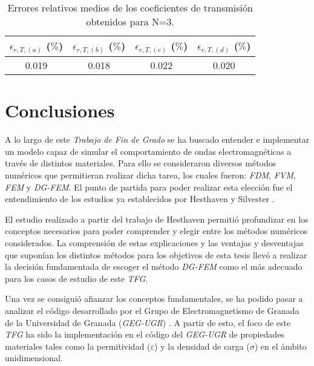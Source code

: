 \documentclass[11pt,a4paper,twoside,pdf]{article}
\numberwithin{equation}{section}
\begin{document}
\begin{table}[H]
\centering
\begin{tabular}{|c|c|c|c|}
\hline
\textbf{$\epsilon_{r,T,(a)}$ ($\%$)} & \textbf{$\epsilon_{r,T,(b)}$ ($\%$)} & \textbf{$\epsilon_{r,T,(c)}$ ($\%$)} & \textbf{$\epsilon_{r,T,(d)}$ ($\%$)} \\ \hline
0.019                                & 0.018                                & 0.022                                & 0.020                                \\ \hline
\end{tabular}
\caption{Errores relativos medios de los coeficientes de transmisión obtenidos para N=3.}
\label{tab5}
\end{table}

\newpage

\section{Conclusiones}

A lo largo de este \textit{Trabajo de Fin de Grado} se ha buscado entender e implementar un modelo capaz de simular el comportamiento de ondas electromagnéticas a través de distintos materiales. Para ello se consideraron diversos métodos numéricos que permitieran realizar dicha tarea, los cuales fueron: \textit{FDM}, \textit{FVM}, \textit{FEM} y \textit{DG-FEM}. El punto de partida para poder realizar esta elección fue el entendimiento de los estudios ya establecidos por Hesthaven \cite{Hesthaven} y Silvester \cite{Silvester}.

El estudio realizado a partir del trabajo de Hesthaven permitió profundizar en los conceptos necesarios para poder comprender y elegir entre los métodos numéricos considerados. La comprensión de estas explicaciones y las ventajas y desventajas que suponían los distintos métodos para los objetivos de esta tesis llevó a realizar la decisión fundamentada de escoger el método \textit{DG-FEM} como el más adecuado para los casos de estudio de este \textit{TFG}. 

Una vez se consiguió afianzar los conceptos fundamentales, se ha podido pasar a analizar el código desarrollado por el Grupo de Electromagnetismo de Granada de la Universidad de Granada (\textit{GEG-UGR}) \cite{repo}. A partir de esto, el foco de este \textit{TFG} ha sido la implementación en el código del \textit{GEG-UGR} de propiedades materiales tales como la permitividad ($\varepsilon$) y la densidad de carga ($\sigma$) en el ámbito unidimensional.
\end{document}
